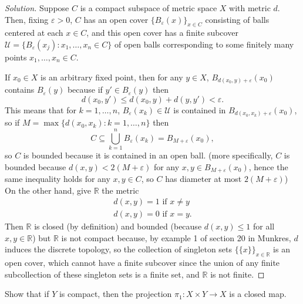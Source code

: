 \documentclass[10pt]{article}
\providecommand{\eps}{\varepsilon}
\providecommand{\RR}{\mathbb R}
\newenvironment{soln}{\begin{proof}[Solution]}{\end{proof}}
\begin{document}
\begin{soln}
    Suppose $C$ is a compact subspace of metric space $X$ with metric $d$.
    Then, fixing $\eps > 0$, $C$ has an open cover
    $\{B_\eps(x)\}_{x\in C}$ consisting of balls centered at each $x\in C$,
    and this open cover has a finite subcover
    $\mathcal U = \{B_\eps(x_j) : x_1,\dots,x_n\in C\}$
    of open balls corresponding to some finitely many points $x_1,\dots,x_n\in C$.

    If $x_0\in X$ is an arbitrary fixed point, then for any $y\in X$,
    $B_{d(x_0,y) + \eps}(x_0)$ contains $B_\eps(y)$ because
    if $y'\in B_\eps(y)$ then
    \begin{equation*}
        d(x_0,y')\le d(x_0,y) + d(y,y') < \eps.
    \end{equation*}
    This means that for $k=1,\dots,n$,
    $B_\eps(x_k)\in\mathcal U$ is contained in $B_{d(x_0,x_k)+\eps}(x_0)$, so
    if $M = \max\{d(x_0,x_k) : k=1,\dots,n\}$ then
    \begin{equation*}
	C\subseteq \bigcup_{k=1}^n B_\eps(x_k) = B_{M+\eps}(x_0),
    \end{equation*}
    so $C$ is bounded because it is contained in an open ball.
    (more specifically, $C$ is bounded because
    $d(x,y) < 2(M+\eps)$ for any $x,y\in B_{M+\eps}(x_0)$,
    hence the same inequality holds for any $x,y\in C$,
    so $C$ has diameter at most $2(M+\eps)$)
    \\

    On the other hand, give $\RR$ the metric
    \begin{align*}
	d(x,y) = 1\text{ if }x\ne y\\
	d(x,y) = 0\text{ if }x=y.
    \end{align*}
    Then $\RR$ is closed (by definition) and bounded (because $d(x,y) \le 1$
    for all $x,y\in\RR$) but $\RR$ is not compact
    because, by example 1 of section 20 in Munkres,
    $d$ induces the discrete topology, so the collection of singleton sets
    $\{\{x\}\}_{x\in\RR}$ is an open cover, which cannot have a finite subcover
    since the union of any finite subcollection of these singleton sets
    is a finite set, and $\RR$ is not finite.
\end{soln}

\begin{problem}
    [Munkres 26.7]
    Show that if $Y$ is compact, then the projection
    $\pi_1\colon X\times Y\to X$ is a closed map.
\end{problem}
\end{document}
